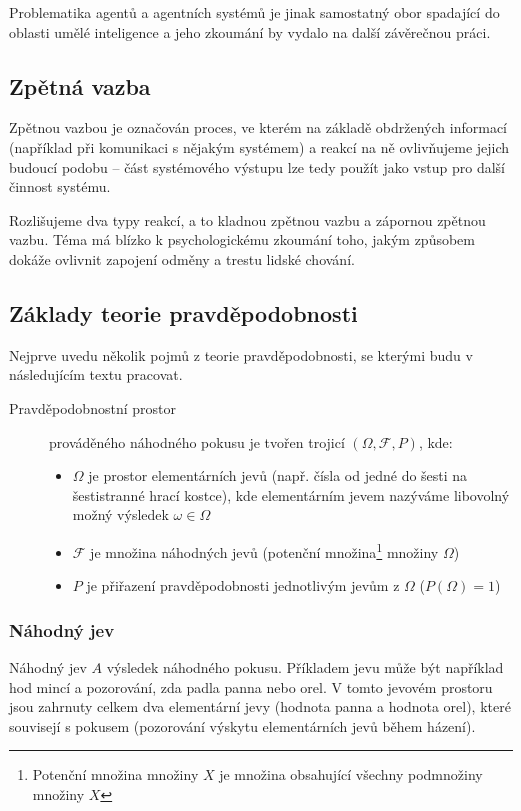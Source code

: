 \documentclass[thesis=M,czech]{FITthesis}[2014/05/07]
\begin{document}
Problematika agentů a agentních systémů je jinak samostatný obor spadající do oblasti umělé inteligence a jeho zkoumání by vydalo na další závěrečnou práci. 

\subsection{Zpětná vazba}
Zpětnou vazbou je označován proces, ve kterém na základě obdržených informací (například při komunikaci s nějakým systémem) a reakcí na ně ovlivňujeme jejich budoucí podobu – část systémového výstupu lze tedy použít jako vstup pro další činnost systému.

Rozlišujeme dva typy reakcí, a to kladnou zpětnou vazbu a zápornou zpětnou vazbu. Téma má blízko k psychologickému zkoumání toho, jakým způsobem dokáže ovlivnit zapojení odměny a trestu lidské chování.

\subsection{Základy teorie pravděpodobnosti}

Nejprve uvedu několik pojmů z teorie pravděpodobnosti, se kterými budu v následujícím textu pracovat.

\begin{description}
	\item[Pravděpodobnostní prostor] prováděného náhodného pokusu je tvořen trojicí $(\Omega,\mathcal{F},P)$, kde:
	\begin{itemize}
		\item $\Omega$ je prostor elementárních jevů (např. čísla od jedné do šesti na šestistranné hrací kostce), kde elementárním jevem nazýváme libovolný možný výsledek $\omega \in \Omega$ 
		\item $\mathcal{F}$ je množina náhodných jevů (potenční množina\footnote{Potenční množina množiny $X$ je množina obsahující všechny podmnožiny množiny $X$} množiny $\Omega$)
		\item $P$ je přiřazení pravděpodobnosti jednotlivým jevům z $\Omega$ ($P(\Omega)=1$)
	\end{itemize}
\end{description}

\subsubsection{Náhodný jev}
Náhodný jev $A$ výsledek náhodného pokusu. Příkladem jevu může být například hod mincí a pozorování, zda padla panna nebo orel. V tomto jevovém prostoru jsou zahrnuty celkem dva elementární jevy (hodnota panna a hodnota orel), které souvisejí s pokusem (pozorování výskytu elementárních jevů během házení).
\end{document}
